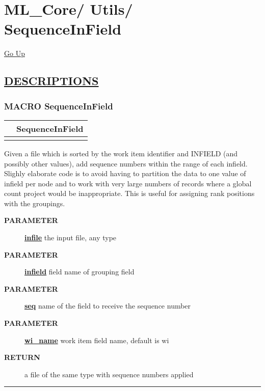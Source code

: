 \chapter*{\color{headfile}
{\large ML\_Core\slash\hspace{0pt}}
{\large Utils\slash\hspace{0pt}}
 \\
SequenceInField
}
\hypertarget{ecldoc:toc:ML_Core.Utils.SequenceInField}{}
\hyperlink{ecldoc:toc:root/ML_Core/Utils}{Go Up}


\section*{\underline{\textsf{DESCRIPTIONS}}}
\subsection*{\textsf{\colorbox{headtoc}{\color{white} MACRO}
SequenceInField}}

\hypertarget{ecldoc:ml_core.utils.sequenceinfield}{}

{\renewcommand{\arraystretch}{1.5}
\begin{tabularx}{\textwidth}{|>{\raggedright\arraybackslash}l|X|}
\hline
\hspace{0pt}\mytexttt{\color{red} } & \textbf{SequenceInField} \\
\hline
\multicolumn{2}{|>{\raggedright\arraybackslash}X|}{\hspace{0pt}\mytexttt{\color{param} (infile,infield,seq,wi\_name='wi')}} \\
\hline
\end{tabularx}
}

\par
Given a file which is sorted by the work item identifier and INFIELD (and possibly other values), add sequence numbers within the range of each infield. Slighly elaborate code is to avoid having to partition the data to one value of infield per node and to work with very large numbers of records where a global count project would be inappropriate. This is useful for assigning rank positions with the groupings.

\par
\begin{description}
\item [\colorbox{tagtype}{\color{white} \textbf{\textsf{PARAMETER}}}] \textbf{\underline{infile}} the input file, any type
\item [\colorbox{tagtype}{\color{white} \textbf{\textsf{PARAMETER}}}] \textbf{\underline{infield}} field name of grouping field
\item [\colorbox{tagtype}{\color{white} \textbf{\textsf{PARAMETER}}}] \textbf{\underline{seq}} name of the field to receive the sequence number
\item [\colorbox{tagtype}{\color{white} \textbf{\textsf{PARAMETER}}}] \textbf{\underline{wi\_name}} work item field name, default is wi
\item [\colorbox{tagtype}{\color{white} \textbf{\textsf{RETURN}}}] \textbf{\underline{}} a file of the same type with sequence numbers applied
\end{description}

\rule{\linewidth}{0.5pt}
